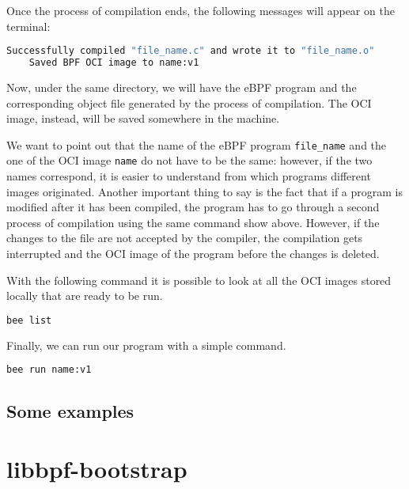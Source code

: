 Once the process of compilation ends, the following messages will appear on the terminal: 

\begin{lstlisting}[language=bash, caption={bee built command}]
	Successfully compiled "file_name.c" and wrote it to "file_name.o"
	Saved BPF OCI image to name:v1
\end{lstlisting}

Now, under the same directory, we will have the eBPF program and the corresponding object file generated by the process of compilation.
The OCI image, instead, will be saved somewhere in the machine.

We want to point out that the name of the eBPF program \verb|file_name| and the one of the OCI image \verb|name| do not have to be the same: however, if the two names correspond, it is easier to understand from which programs different images originated.
Another important thing to say is the fact that if a program is modified after it has been compiled, the program has to go through a second process of compilation using the same command show above.
However, if the changes to the file are not accepted by the compiler, the compilation gets interrupted and the OCI image of the program before the changes is deleted.

With the following command it is possible to look at all the OCI images stored locally that are ready to be run.

\begin{lstlisting}[language=bash, caption={bee list command}]
	bee list
\end{lstlisting}

Finally, we can run our program with a simple command.

\begin{lstlisting}[language=bash, caption={bee run command}]
	bee run name:v1
\end{lstlisting}


\subsection{Some examples}

\section{libbpf-bootstrap}







